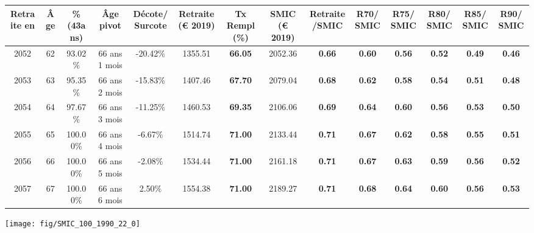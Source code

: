 \begin{adjustbox}{max width=\textwidth} 
\begin{tabular}[htb]{|c|c||c|c|c||c|c||c|c||c|c|c|c|c|} 
\hline 
 Retraite en &  Âge &  \%(43ans) &  Âge pivot &  Décote/Surcote &  Retraite (\euro{} 2019) &  Tx Rempl(\%) &  SMIC (\euro{} 2019) &  Retraite/SMIC &  R70/SMIC &  R75/SMIC &  R80/SMIC &  R85/SMIC &  R90/SMIC \\ 
\hline \hline 
 2052 &  62 &  93.02\% &  66 ans 1 mois &  -20.42\% &  1355.51 &  {\bf 66.05} &  2052.36 &  {\bf {\color{red} 0.66}} &  {\bf {\color{red} 0.60}} &  {\bf {\color{red} 0.56}} &  {\bf {\color{red} 0.52}} &  {\bf {\color{red} 0.49}} &  {\bf {\color{red} 0.46}} \\ 
\hline 
 2053 &  63 &  95.35\% &  66 ans 2 mois &  -15.83\% &  1407.46 &  {\bf 67.70} &  2079.04 &  {\bf {\color{red} 0.68}} &  {\bf {\color{red} 0.62}} &  {\bf {\color{red} 0.58}} &  {\bf {\color{red} 0.54}} &  {\bf {\color{red} 0.51}} &  {\bf {\color{red} 0.48}} \\ 
\hline 
 2054 &  64 &  97.67\% &  66 ans 3 mois &  -11.25\% &  1460.53 &  {\bf 69.35} &  2106.06 &  {\bf {\color{red} 0.69}} &  {\bf {\color{red} 0.64}} &  {\bf {\color{red} 0.60}} &  {\bf {\color{red} 0.56}} &  {\bf {\color{red} 0.53}} &  {\bf {\color{red} 0.50}} \\ 
\hline 
 2055 &  65 &  100.00\% &  66 ans 4 mois &  -6.67\% &  1514.74 &  {\bf 71.00} &  2133.44 &  {\bf {\color{red} 0.71}} &  {\bf {\color{red} 0.67}} &  {\bf {\color{red} 0.62}} &  {\bf {\color{red} 0.58}} &  {\bf {\color{red} 0.55}} &  {\bf {\color{red} 0.51}} \\ 
\hline 
 2056 &  66 &  100.00\% &  66 ans 5 mois &  -2.08\% &  1534.44 &  {\bf 71.00} &  2161.18 &  {\bf {\color{red} 0.71}} &  {\bf {\color{red} 0.67}} &  {\bf {\color{red} 0.63}} &  {\bf {\color{red} 0.59}} &  {\bf {\color{red} 0.56}} &  {\bf {\color{red} 0.52}} \\ 
\hline 
 2057 &  67 &  100.00\% &  66 ans 6 mois &  2.50\% &  1554.38 &  {\bf 71.00} &  2189.27 &  {\bf {\color{red} 0.71}} &  {\bf {\color{red} 0.68}} &  {\bf {\color{red} 0.64}} &  {\bf {\color{red} 0.60}} &  {\bf {\color{red} 0.56}} &  {\bf {\color{red} 0.53}} \\ 
\hline 
\hline 
\end{tabular} 
\end{adjustbox} 
 
 \vspace{0.1cm} 

 {\hspace{-2.2cm}\texttt{[image: fig/SMIC\_100\_1990\_22\_0]}} 

